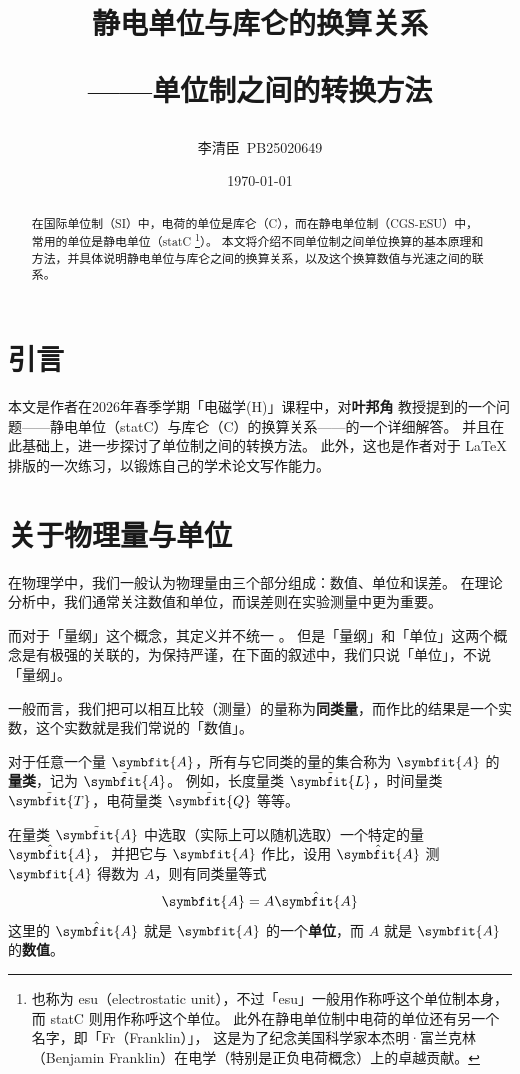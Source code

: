 \documentclass[12pt,a4paper,UTF8,fontset=lxgw]{ctexart}
\title{静电单位与库仑的换算关系 \\[1ex] \large
\begin{flushright}
    ——单位制之间的转换方法
\end{flushright}}
\author{李清臣\ PB25020649}
\date{\today}
\begin{document}
\maketitle

\begin{abstract}
    在国际单位制（SI）中，电荷的单位是库仑（C），而在静电单位制（CGS-ESU）中，常用的单位是静电单位（statC \footnote{
        也称为 esu（electrostatic unit），不过「esu」一般用作称呼这个单位制本身，而 statC 则用作称呼这个单位。
        此外在静电单位制中电荷的单位还有另一个名字，即「Fr（Franklin）」，
        这是为了纪念美国科学家本杰明·富兰克林（Benjamin Franklin）在电学（特别是正负电荷概念）上的卓越贡献。
    }）。
    本文将介绍不同单位制之间单位换算的基本原理和方法，并具体说明静电单位与库仑之间的换算关系，以及这个换算数值与光速之间的联系。
\end{abstract}

\section{引言}
本文是作者在2026年春季学期「电磁学(H)」课程中，对\textbf{叶邦角} 教授提到的一个问题——静电单位（statC）与库仑（C）的换算关系——的一个详细解答。
并且在此基础上，进一步探讨了单位制之间的转换方法。
此外，这也是作者对于 \LaTeX 排版的一次练习，以锻炼自己的学术论文写作能力。

\section{关于物理量与单位}
在物理学中，我们一般认为物理量由三个部分组成：数值、单位和误差。
在理论分析中，我们通常关注数值和单位，而误差则在实验测量中更为重要。

而对于「量纲」这个概念，其定义并不统一 \cite{liangcanbin2018}。
但是「量纲」和「单位」这两个概念是有极强的关联的，为保持严谨，在下面的叙述中，我们只说「单位」，不说「量纲」。

一般而言，我们把可以相互比较（测量）的量称为\textbf{同类量}，而作比的结果是一个实数，这个实数就是我们常说的「数值」。

对于任意一个量 $\symbfit{A}$，所有与它同类的量的集合称为 $\symbfit{A}$ 的\textbf{量类}，记为 $\tilde{\symbfit{A}}$。
例如，长度量类 $\tilde{\symbfit{L}}$，时间量类 $\tilde{\symbfit{T}}$，电荷量类 $\tilde{\symbfit{Q}}$ 等等。

在量类 $\tilde{\symbfit{A}}$ 中选取（实际上可以随机选取）一个特定的量 $\hat{\symbfit{A}}$，
并把它与 $\symbfit{A}$ 作比，设用 $\hat{\symbfit{A}}$ 测 $\symbfit{A}$ 得数为 $A$，则有同类量等式
\begin{equation}
    \symbfit{A} = A \hat{\symbfit{A}}
    \label{eq:like-quantity-equality}
\end{equation}
这里的 $\hat{\symbfit{A}}$ 就是 $\symbfit{A}$ 的一个\textbf{单位}，而 $A$ 就是 $\symbfit{A}$ 的\textbf{数值}。
\end{document}
